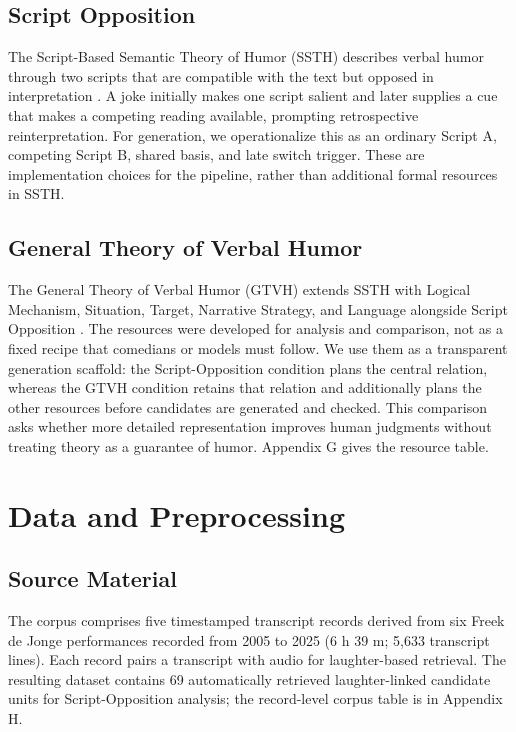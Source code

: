 \documentclass[11pt]{article}
\begin{document}
\subsection{Script Opposition}\label{script-opposition}

The Script-Based Semantic Theory of Humor (SSTH) describes verbal humor through two scripts that are compatible with the text but opposed in interpretation \citep{raskin1985}. A joke initially makes one script salient and later supplies a cue that makes a competing reading available, prompting retrospective reinterpretation. For generation, we operationalize this as an ordinary Script A, competing Script B, shared basis, and late switch trigger. These are implementation choices for the pipeline, rather than additional formal resources in SSTH.

\subsection{General Theory of Verbal Humor}\label{general-theory-of-verbal-humor}

The General Theory of Verbal Humor (GTVH) extends SSTH with Logical Mechanism, Situation, Target, Narrative Strategy, and Language alongside Script Opposition \citep{attardo1991}. The resources were developed for analysis and comparison, not as a fixed recipe that comedians or models must follow. We use them as a transparent generation scaffold: the Script-Opposition condition plans the central relation, whereas the GTVH condition retains that relation and additionally plans the other resources before candidates are generated and checked. This comparison asks whether more detailed representation improves human judgments without treating theory as a guarantee of humor. Appendix G gives the resource table.

\section{Data and Preprocessing}\label{data-and-preprocessing}

\subsection{Source Material}\label{source-material}

The corpus comprises five timestamped transcript records derived from six Freek de Jonge performances recorded from 2005 to 2025 (6 h 39 m; 5,633 transcript lines). Each record pairs a transcript with audio for laughter-based retrieval. The resulting dataset contains 69 automatically retrieved laughter-linked candidate units for Script-Opposition analysis; the record-level corpus table is in Appendix H.
\end{document}
